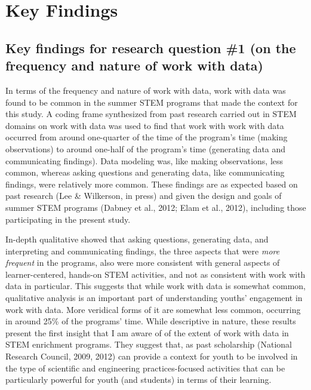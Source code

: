 \documentclass[]{book}
\theoremstyle{definition}
\theoremstyle{definition}
\theoremstyle{definition}
\theoremstyle{remark}
\begin{document}
\section{Key Findings}\label{key-findings}

\subsection{Key findings for research question \#1 (on the frequency and
nature of work with
data)}\label{key-findings-for-research-question-1-on-the-frequency-and-nature-of-work-with-data}

In terms of the frequency and nature of work with data, work with data
was found to be common in the summer STEM programs that made the context
for this study. A coding frame synthesized from past research carried
out in STEM domains on work with data was used to find that work with
work with data occurred from around one-quarter of the time of the
program's time (making observations) to around one-half of the program's
time (generating data and communicating findings). Data modeling was,
like making observations, less common, whereas asking questions and
generating data, like communicating findings, were relatively more
common. These findings are as expected based on past research (Lee \&
Wilkerson, in press) and given the design and goals of summer STEM
programs (Dabney et al., 2012; Elam et al., 2012), including those
participating in the present study.

In-depth qualitative showed that asking questions, generating data, and
interpreting and communicating findings, the three aspects that were
\emph{more frequent} in the programs, also were more consistent with
general aspects of learner-centered, hands-on STEM activities, and not
as consistent with work with data in particular. This suggests that
while work with data is somewhat common, qualitative analysis is an
important part of understanding youths' engagement in work with data.
More veridical forms of it are somewhat less common, occurring in around
25\% of the programs' time. While descriptive in nature, these results
present the first insight that I am aware of of the extent of work with
data in STEM enrichment programs. They suggest that, as past scholarship
(National Research Council, 2009, 2012) can provide a context for youth
to be involved in the type of scientific and engineering
practices-focused activities that can be particularly powerful for youth
(and students) in terms of their learning.
\end{document}
